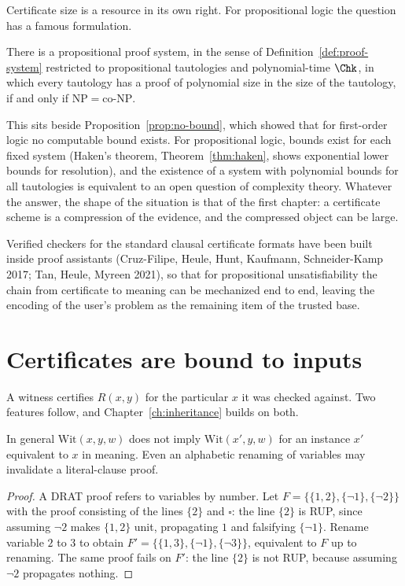 Certificate size is a resource in its own right. For propositional logic the question has a famous formulation.

\begin{theorem}
\label{thm:cook-reckhow}
 There is a propositional proof system, in the sense of Definition~\ref{def:proof-system} restricted to propositional tautologies and polynomial-time $\Chk$, in which every tautology has a proof of polynomial size in the size of the tautology, if and only if $\mathrm{NP}=\mathrm{co}\mbox{-}\mathrm{NP}$.
\end{theorem}

This sits beside Proposition~\ref{prop:no-bound}, which showed that for first-order logic no computable bound exists. For propositional logic, bounds exist for each fixed system (Haken's theorem, Theorem~\ref{thm:haken}, shows exponential lower bounds for resolution), and the existence of a system with polynomial bounds for all tautologies is equivalent to an open question of complexity theory. Whatever the answer, the shape of the situation is that of the first chapter: a certificate scheme is a compression of the evidence, and the compressed object can be large.

Verified checkers for the standard clausal certificate formats have been built inside proof assistants (Cruz-Filipe, Heule, Hunt, Kaufmann, Schneider-Kamp 2017; Tan, Heule, Myreen 2021), so that for propositional unsatisfiability the chain from certificate to meaning can be mechanized end to end, leaving the encoding of the user's problem as the remaining item of the trusted base.

\section{Certificates are bound to inputs}
\label{sec:binding}

A witness certifies $R(x,y)$ for the particular $x$ it was checked against. Two features follow, and Chapter~\ref{ch:inheritance} builds on both.

\begin{proposition}
\label{prop:binding}
In general $\mathrm{Wit}(x,y,w)$ does not imply $\mathrm{Wit}(x',y,w)$ for an instance $x'$ equivalent to $x$ in meaning. Even an alphabetic renaming of variables may invalidate a literal-clause proof.
\end{proposition}

\begin{proof}
A DRAT proof refers to variables by number. Let $F=\{\{1,2\},\{\neg1\},\{\neg2\}\}$ with the proof consisting of the lines $\{2\}$ and $\square$: the line $\{2\}$ is RUP, since assuming $\neg2$ makes $\{1,2\}$ unit, propagating $1$ and falsifying $\{\neg1\}$. Rename variable $2$ to $3$ to obtain $F'=\{\{1,3\},\{\neg1\},\{\neg3\}\}$, equivalent to $F$ up to renaming. The same proof fails on $F'$: the line $\{2\}$ is not RUP, because assuming $\neg2$ propagates nothing.
\end{proof}


